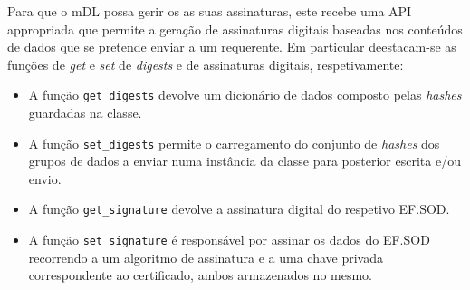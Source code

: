Para que o mDL possa gerir os as suas assinaturas, este recebe uma API appropriada que permite a geração de assinaturas digitais baseadas nos conteúdos de dados que se pretende enviar a um requerente. Em particular deestacam-se as funções de \textit{get} e \textit{set} de \textit{digests} e de assinaturas digitais, respetivamente:

\begin{itemize}
    \item A função \texttt{get_digests} devolve um dicionário de dados composto pelas \textit{hashes} guardadas na classe.
    \item A função \texttt{set_digests} permite o carregamento do conjunto de \textit{hashes} dos grupos de dados a enviar numa instância da classe para posterior escrita e/ou envio.
    \item A função \texttt{get_signature} devolve a assinatura digital do respetivo EF.SOD.
    \item A função \texttt{set_signature} é responsável por assinar os dados do EF.SOD recorrendo a um algoritmo de assinatura e a uma chave privada correspondente ao certificado, ambos armazenados no mesmo.
\end{itemize}

